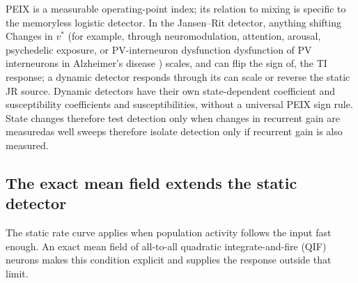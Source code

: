 \documentclass[11pt,a4paper]{article}
\providecommand{\DIFaddtex}[1]{{\protect\color{blue} \sf #1}} %
\providecommand{\DIFdeltex}[1]{{\protect\color{red} \scriptsize #1}} %
\providecommand{\DIFaddbegin}{} %
\providecommand{\DIFaddend}{} %
\providecommand{\DIFdelbegin}{} %
\providecommand{\DIFdelend}{} %
\providecommand{\DIFadd}[1]{\texorpdfstring{\DIFaddtex{#1}}{#1}} %
\providecommand{\DIFdel}[1]{\texorpdfstring{\DIFdeltex{#1}}{}} %
\begin{document}
\DIFdelbegin \DIFdel{PEIX is a measurable operating-point index; its relation to mixing is specific
to the memoryless logistic detector. In the Jansen--Rit detector, anything shifting }\DIFdelend \DIFaddbegin \DIFadd{Changes in }\DIFaddend $v^*$ \DIFdelbegin \DIFdel{(for example, }\DIFdelend \DIFaddbegin \DIFadd{through }\DIFaddend neuromodulation, attention, arousal, psychedelic
exposure, or \DIFdelbegin \DIFdel{PV-interneuron dysfunction }\DIFdelend \DIFaddbegin \DIFadd{dysfunction of PV interneurons }\DIFaddend in Alzheimer's disease \DIFdelbegin \DIFdel{) scales, and can flip the sign of, the TI response; a dynamic detector responds through its }\DIFdelend \DIFaddbegin \DIFadd{can scale or
reverse the static JR source. Dynamic detectors have their }\DIFaddend own state-dependent
\DIFdelbegin \DIFdel{coefficient and susceptibility}\DIFdelend \DIFaddbegin \DIFadd{coefficients and susceptibilities}\DIFaddend , without a universal \DIFaddbegin \DIFadd{PEIX }\DIFaddend sign rule.
State \DIFdelbegin \DIFdel{changes therefore test detection only when changes in recurrent gain are measuredas well}\DIFdelend \DIFaddbegin \DIFadd{sweeps therefore isolate detection only if recurrent gain is also measured}\DIFaddend .

\DIFdelbegin %

\DIFdelend \subsection{The exact mean field extends the static detector}\label{sec:dynamic}
The \DIFdelbegin \DIFdel{static rate curve applies when population activity follows the input fast
enough. An }\DIFdelend exact mean field of \DIFaddbegin \DIFadd{all-to-all }\DIFaddend quadratic integrate-and-fire (QIF) neurons
\DIFdelbegin \DIFdel{makes
this condition explicit and supplies the response outside that limit.
}%
\end{document}
